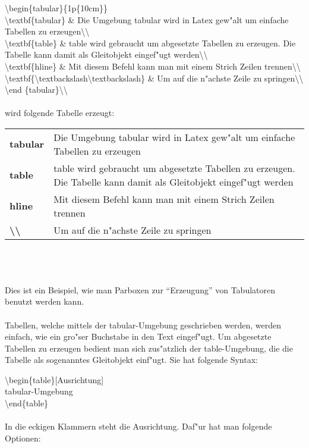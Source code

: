 \textbackslash begin\{tabular\}\{1p\{10cm\}\}\\
\textbackslash textbf\{tabular\} \& Die Umgebung tabular wird in Latex gew"alt um einfache Tabellen zu erzeugen\textbackslash\textbackslash\\
\textbackslash textbf\{table\} \& table wird gebraucht um abgesetzte Tabellen zu erzeugen. Die Tabelle kann damit als Gleitobjekt eingef"ugt werden\textbackslash\textbackslash\\
\textbackslash textbf\{hline\} \& Mit diesem Befehl kann man mit einem Strich Zeilen trennen\textbackslash\textbackslash\\
\textbackslash textbf\{\textbackslash textbackslash\textbackslash textbackslash\} \& Um auf die n"achste Zeile zu springen\textbackslash\textbackslash\\
\textbackslash end \{tabular\}\textbackslash\textbackslash\\
\\
wird folgende Tabelle erzeugt:\\

\begin{tabular}{lp{10cm}}
\textbf{tabular} & Die Umgebung tabular wird in Latex gew"alt um einfache Tabellen zu erzeugen\\
\textbf{table}& table wird gebraucht um abgesetzte Tabellen zu erzeugen. Die Tabelle kann damit als Gleitobjekt eingef"ugt werden\\
\textbf{hline}& Mit diesem Befehl kann man mit einem Strich Zeilen trennen\\
\textbf{\textbackslash\textbackslash}& Um auf die n"achste Zeile zu springen\\
\end {tabular}\\
\\
\\
Dies ist ein Beispiel, wie man Parboxen zur ``Erzeugung'' von Tabulatoren benutzt werden 
kann. \\
\\
Tabellen, welche mittels der tabular-Umgebung geschrieben werden, werden einfach, wie ein 
gro"ser Buchstabe in den Text eingef"ugt. Um abgesetzte Tabellen zu erzeugen bedient man 
sich zus"atzlich der table-Umgebung, die die Tabelle als sogenanntes Gleitobjekt einf"ugt. Sie 
hat folgende Syntax: 
 
\textbackslash begin\{table\}[Ausrichtung] \\
tabular-Umgebung \\
\textbackslash end\{table\}\\ 
\\
In die eckigen Klammern steht die Ausrichtung. Daf"ur hat man folgende Optionen: 

